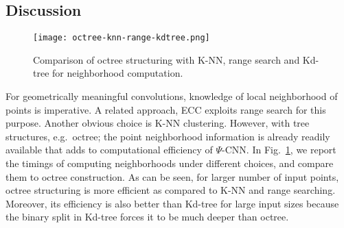\documentclass[10pt,twocolumn,letterpaper]{article}
\begin{document}
{\subsection{Discussion}
\begin{figure}[h!]
\texttt{[image: octree-knn-range-kdtree.png]}
\caption{Comparison of octree structuring with K-NN, range search and Kd-tree for neighborhood computation. }\label{time-analysis}
\label{fig:graphs}
\vspace{-4mm}
\end{figure}
For geometrically meaningful convolutions, knowledge of local neighborhood of points is imperative. A related approach, ECC \cite{simonovsky2017dynamic} exploits range search for this purpose. Another obvious choice is K-NN clustering. However, with tree structures, e.g.~octree; the point neighborhood information is already readily available that adds to computational efficiency of $\Psi$-CNN. In Fig.~\ref{fig:graphs}, we report the timings of computing neighborhoods under different choices, and compare them to octree construction. As can be seen, for larger number of input points, octree structuring is more efficient as compared to K-NN and range searching. Moreover, its efficiency is also better than Kd-tree for large input sizes because the binary split in Kd-tree forces it to be much deeper than octree.  


}
\end{document}
